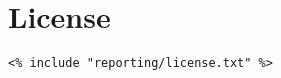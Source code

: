\documentclass[fontsize=10pt,toc=chapterentrywithdots]{scrreprt}
\begin{document}
\clearpage
\chapter*{License}
\label{sec:license}

\begingroup
\small
\begin{verbatim}
<% include "reporting/license.txt" %>
\end{verbatim}
\endgroup
\end{document}

